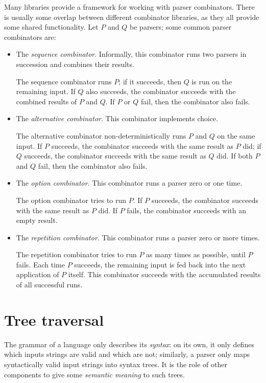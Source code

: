 \documentclass[UdineBachThesis,american,11pt,draft]{PhdThesis}
\begin{document}
  Many libraries provide a framework for working with parser combinators. There
  is usually some overlap between different combinator libraries, as they all
  provide some shared functionality. Let $P$ and $Q$ be parsers; some common
  parser combinators are:

  \begin{itemize}
    \item The \emph{sequence combinator}. Informally, this combinator runs two
    parsers in succession and combines their results.

    The sequence combinator runs $P$; if it succeeds, then $Q$ is run on the
    remaining input. If $Q$ also succeeds, the combinator succeeds with the
    combined results of $P$ and $Q$\@. If $P$ or $Q$ fail, then the combinator
    also fails.

    \item The \emph{alternative combinator}. This combinator implements choice.

    The alternative combinator non-deterministically runs $P$ and $Q$ on the
    same input. If $P$ succeeds, the combinator succeeds with the same result as
    $P$ did; if $Q$ succeeds, the combinator succeeds with the same result as
    $Q$ did. If both $P$ and $Q$ fail, then the combinator also fails.

    \item The \emph{option combinator}. This combinator runs a parser zero or
    one time.

    The option combinator tries to run $P$\@. If $P$ succeeds, the combinator
    succeeds with the same result as $P$ did. If $P$ fails, the combinator
    succeeds with an empty result.

    \item The \emph{repetition combinator}. This combinator runs a parser zero
    or more times.

    The repetition combinator tries to run $P$ as many times as possible, until
    $P$ fails. Each time $P$ succeeds, the remaining input is fed back into the
    next application of $P$ itself. This combinator succeeds with the
    accumulated results of all successful runs.
  \end{itemize}

  \section{Tree traversal}

  The grammar of a language only describes its \emph{syntax}: on its own, it
  only defines which inputs strings are valid and which are not; similarly, a
  parser only maps syntactically valid input strings into syntax trees. It is
  the role of other components to give some \emph{semantic meaning} to such
  trees.
\end{document}
